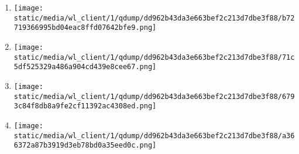 \documentclass{article}
\begin{document}
\begin{enumerate}[label=(\alph*)]
\item  \texttt{[image: static/media/wl\_client/1/qdump/dd962b43da3e663bef2c213d7dbe3f88/b72719366995bd04eac8ffd07642bfe9.png]}
\item  \texttt{[image: static/media/wl\_client/1/qdump/dd962b43da3e663bef2c213d7dbe3f88/71c5df525329a486a904cd439e8cee67.png]}
\item  \texttt{[image: static/media/wl\_client/1/qdump/dd962b43da3e663bef2c213d7dbe3f88/6793c84f8db8a9fe2cf11392ac4308ed.png]}
\item  \texttt{[image: static/media/wl\_client/1/qdump/dd962b43da3e663bef2c213d7dbe3f88/a366372a87b3919d3eb78bd0a35eed0c.png]}
\end{enumerate}
\newpage
\end{document}
